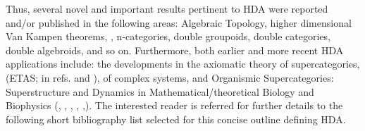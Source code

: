 \documentclass[12pt]{article}
\theoremstyle{plain}
\theoremstyle{definition}
\numberwithin{equation}{section}
\newcommand{\<}{{\langle}}
\begin{document}
Thus, several novel and important results pertinent to HDA were reported and/or published in the following areas: Algebraic Topology, higher dimensional Van Kampen theorems, , n-categories, double groupoids, double categories, double algebroids, and so on. Furthermore, both earlier and more recent HDA applications include: the developments in the axiomatic theory of supercategories, (ETAS; in refs. \cite{ICB1} and \cite{ICB71b}),  of complex systems, and Organismic Supercategories: Superstructure and Dynamics in Mathematical/theoretical Biology and Biophysics (\cite{ICB71a}, \cite{ICB71b}, \cite{ICB73}, \cite{ICB-MM}, \cite{ICB77, ICB80,ICB87},\cite{B-P-P2k4, B-P2k3}). The interested reader is
referred for further details to the following short bibliography list selected for this concise 
outline defining HDA. 
\end{document}
